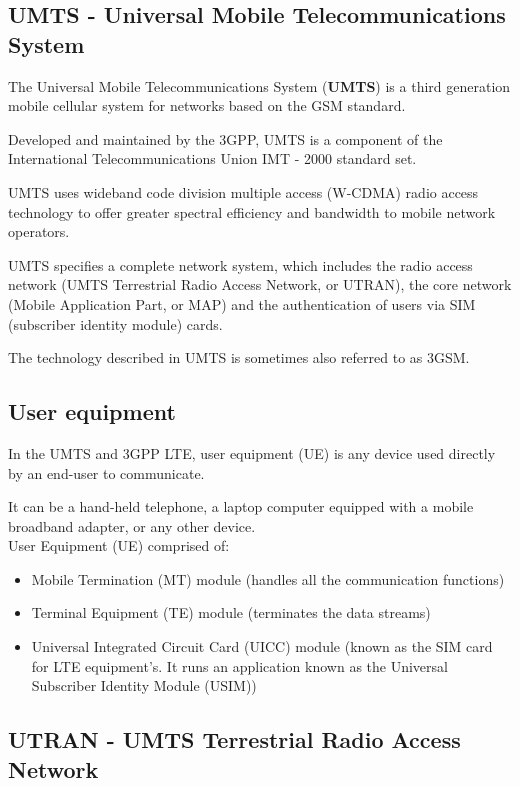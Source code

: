 \subsection{UMTS - Universal Mobile Telecommunications System}

The Universal Mobile Telecommunications System (\textbf{UMTS}) is a third
generation mobile cellular system for networks based on the GSM standard.

Developed and maintained by the 3GPP, UMTS is a component of the International
Telecommunications Union IMT - 2000 standard set.

UMTS uses wideband code division multiple access (W-CDMA) radio access
technology to offer greater spectral efficiency and bandwidth to mobile network
operators.

UMTS specifies a complete network system, which includes the radio access
network (UMTS Terrestrial Radio Access Network, or UTRAN), the core network
(Mobile Application Part, or MAP) and the authentication of users via SIM
(subscriber identity module) cards.

The technology described in UMTS is sometimes also referred to as 3GSM.

\subsection{User equipment}

In the UMTS and 3GPP LTE, user equipment (UE) is any device used directly by an
end-user to communicate.

It can be a hand-held telephone, a laptop computer equipped with a mobile
broadband adapter, or any other device. \\

User Equipment (UE) comprised of:

\begin{itemize}
  \item Mobile Termination (MT) module (handles all the communication
functions)
  \item Terminal Equipment (TE) module (terminates the data streams)
  \item Universal Integrated Circuit Card (UICC) module (known as the SIM card
for LTE equipment's. It runs an application known as the Universal Subscriber
Identity Module (USIM))
\end{itemize}

\subsection{UTRAN - UMTS Terrestrial Radio Access Network}

